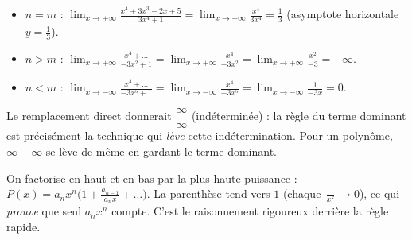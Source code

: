 \documentclass[11pt,a4paper]{article}
\begin{document}
\begin{exemple}
\begin{itemize}[leftmargin=1.6em,topsep=2pt,itemsep=3pt]
  \item $n=m$ : $\displaystyle\lim_{x\to+\infty}\frac{x^4+3x^3-2x+5}{3x^4+1}=\lim_{x\to+\infty}\frac{x^4}{3x^4}=\frac13$ (asymptote horizontale $y=\tfrac13$).
  \item $n>m$ : $\displaystyle\lim_{x\to+\infty}\frac{x^4+\dots}{-3x^2+1}=\lim_{x\to+\infty}\frac{x^4}{-3x^2}=\lim_{x\to+\infty}\frac{x^2}{-3}=-\infty$.
  \item $n<m$ : $\displaystyle\lim_{x\to-\infty}\frac{x^4+\dots}{-3x^5+1}=\lim_{x\to-\infty}\frac{x^4}{-3x^5}=\lim_{x\to-\infty}\frac{1}{-3x}=0$.
\end{itemize}
\end{exemple}

\begin{attention}
Le remplacement direct donnerait $\dfrac{\infty}{\infty}$ (indéterminée) : la règle du terme dominant
est précisément la technique qui \emph{lève} cette indétermination. Pour un polynôme,
$\infty-\infty$ se lève de même en gardant le terme dominant.
\end{attention}

\begin{astuce}
On factorise en haut et en bas par la plus haute puissance : $P(x)=a_n x^n\bigl(1+\frac{a_{n-1}}{a_n x}+\dots\bigr)$.
La parenthèse tend vers $1$ (chaque $\frac{\cdot}{x^k}\to 0$), ce qui \emph{prouve} que seul $a_n x^n$
compte. C'est le raisonnement rigoureux derrière la règle rapide.
\end{astuce}
\end{document}
